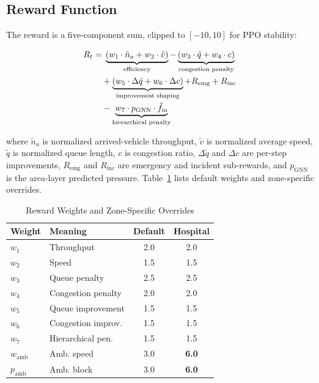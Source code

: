 \documentclass[conference]{IEEEtran}
\begin{document}
\subsection{Reward Function}

The reward is a five-component sum, clipped to $[-10, 10]$ for PPO stability:

\begin{align}
R_t = &\;\underbrace{(w_1 \cdot \tilde{n}_a + w_2 \cdot \tilde{v})}_{\text{efficiency}}
       - \underbrace{(w_3 \cdot \tilde{q} + w_4 \cdot c)}_{\text{congestion penalty}} \notag \\
      &+ \underbrace{(w_5 \cdot \Delta\tilde{q} + w_6 \cdot \Delta c)}_{\text{improvement shaping}}
       + R_{\text{emg}} + R_{\text{inc}} \notag \\
      &- \underbrace{w_7 \cdot p_{\text{GNN}} \cdot \tilde{f}_{\text{in}}}_{\text{hierarchical penalty}}
\label{eq:reward}
\end{align}

where $\tilde{n}_a$ is normalized arrived-vehicle throughput, $\tilde{v}$
is normalized average speed, $\tilde{q}$ is normalized queue length,
$c$ is congestion ratio, $\Delta\tilde{q}$ and $\Delta c$ are per-step
improvements, $R_{\text{emg}}$ and $R_{\text{inc}}$ are emergency and
incident sub-rewards, and $p_{\text{GNN}}$ is the area-layer predicted
pressure. Table~\ref{tab:reward_weights} lists default weights and
zone-specific overrides.

\begin{table}[!t]
\caption{Reward Weights and Zone-Specific Overrides}
\label{tab:reward_weights}
\centering
\renewcommand{\arraystretch}{1.2}
\begin{tabular}{llcc}
\toprule
\textbf{Weight} & \textbf{Meaning} & \textbf{Default} & \textbf{Hospital} \\
\midrule
$w_1$ & Throughput          & 2.0 & 2.0 \\
$w_2$ & Speed               & 1.5 & 1.5 \\
$w_3$ & Queue penalty       & 2.5 & 2.5 \\
$w_4$ & Congestion penalty  & 2.0 & 2.0 \\
$w_5$ & Queue improvement   & 1.5 & 1.5 \\
$w_6$ & Congestion improv.  & 1.5 & 1.5 \\
$w_7$ & Hierarchical pen.   & 1.5 & 1.5 \\
$w_{\text{amb}}$ & Amb. speed  & 3.0 & \textbf{6.0} \\
$p_{\text{amb}}$ & Amb. block  & 3.0 & \textbf{6.0} \\
\bottomrule
\end{tabular}
\end{table}
\end{document}

